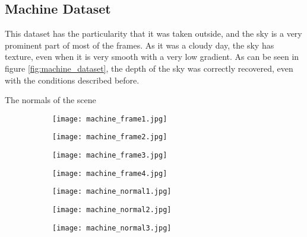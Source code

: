 \documentclass[1p]{elsarticle}
\begin{document}
\subsection{Machine Dataset}

This dataset has the particularity that it was taken outside, and the sky is a very prominent part of most of the frames. As it was a cloudy day, the sky has texture, even when it is very smooth with a very low gradient. As can be seen in figure \ref{fig:machine_dataset}, the depth of the sky was correctly recovered, even with the conditions described before.

The normals of the scene 

\begin{figure}[h]
     \centering
     \begin{subfigure}[b]{0.24\textwidth}
         \centering
         \texttt{[image: machine\_frame1.jpg]}
     \end{subfigure}
     \begin{subfigure}[b]{0.24\textwidth}
         \centering
         \texttt{[image: machine\_frame2.jpg]}
     \end{subfigure}
     \begin{subfigure}[b]{0.24\textwidth}
         \centering
         \texttt{[image: machine\_frame3.jpg]}
     \end{subfigure}
     \centering
     \begin{subfigure}[b]{0.24\textwidth}
         \centering
         \texttt{[image: machine\_frame4.jpg]}
     \end{subfigure}
     \begin{subfigure}[b]{0.24\textwidth}
         \centering
         \texttt{[image: machine\_normal1.jpg]}
     \end{subfigure}
     \begin{subfigure}[b]{0.24\textwidth}
         \centering
         \texttt{[image: machine\_normal2.jpg]}
     \end{subfigure}
     \begin{subfigure}[b]{0.24\textwidth}
         \centering
         \texttt{[image: machine\_normal3.jpg]}
     \end{subfigure}
     \begin{subfigure}[b]{0.24\textwidth}

\end{subfigure}
\end{figure}
\end{document}
